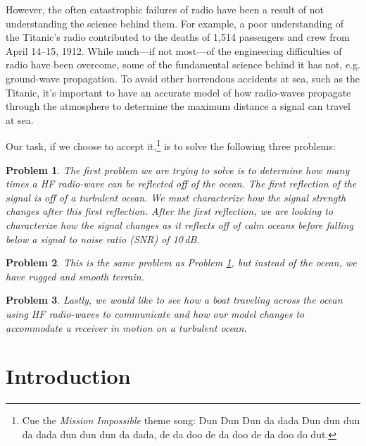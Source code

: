\documentclass[11pt]{article}
\newtheorem{problem}{Problem}
\numberwithin{equation}{section}
\begin{document}
However, the often catastrophic failures of radio have been a result of not understanding the science behind them. For example, a poor understanding of the Titanic's radio contributed to the deaths of 1,514 passengers and crew from April 14--15, 1912.\cite{noauthor_radio_2011} While much---if not most---of the engineering difficulties of radio have been overcome, some of the fundamental science behind it has not, e.g. ground-wave propagation.\cite{budden1961radio} To avoid other horrendous accidents at sea, such as the Titanic, it's important to have an accurate model of how radio-waves propagate through the atmosphere to determine the maximum distance a signal can travel at sea.

Our task, if we choose to accept it,\footnote{Cue the \emph{Mission Impossible} theme song: Dun Dun Dun da dada Dun dun dun da dada dun dun dun da dada, de da doo de da doo de da doo do dut.} is to solve the following three problems:
\begin{problem}
 The first problem we are trying to solve is to determine how many times a HF radio-wave can be reflected off of the ocean. The first reflection of the signal is off of a turbulent ocean. We must characterize how the signal strength changes after this first reflection. After the first reflection, we are looking to characterize how the signal changes as it reflects off of calm oceans before falling below a signal to noise ratio (SNR) of 10\,\si{\dB}.
 \label{pr:turb_ocean}
\end{problem}

\begin{problem}
    This is the same problem as Problem \ref{pr:turb_ocean}, but instead of the ocean, we have rugged and smooth terrain.
    \label{pr:mount}
\end{problem}

\begin{problem}
    Lastly, we would like to see how a boat traveling across the ocean using HF radio-waves to communicate and how our model changes to accommodate a receiver in motion on a turbulent ocean.
    \label{pr:boat}
\end{problem}

\section{Introduction} 
\label{sec: intro} 
\end{document}
